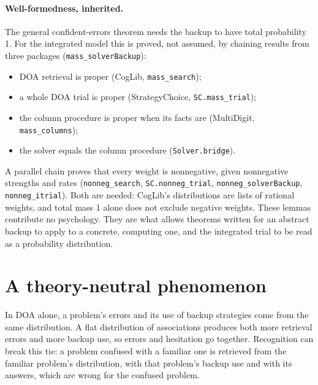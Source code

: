 \documentclass[11pt]{article}
\newcommand{\lean}[1]{\texttt{#1}}
\begin{document}
\paragraph{Well-formedness, inherited.} The general confident-errors theorem needs the backup to have total probability 1. For the integrated model this is proved, not assumed, by chaining results from three packages (\lean{mass\_solverBackup}):
\begin{itemize}
  \item DOA retrieval is proper (CogLib, \lean{mass\_search});
  \item a whole DOA trial is proper (StrategyChoice, \lean{SC.mass\_trial});
  \item the column procedure is proper when its facts are (MultiDigit, \lean{mass\_columns});
  \item the solver equals the column procedure (\lean{Solver.bridge}).
\end{itemize}
A parallel chain proves that every weight is nonnegative, given nonnegative strengths and rates (\lean{nonneg\_search}, \lean{SC.nonneg\_trial}, \lean{nonneg\_solverBackup}, \lean{nonneg\_itrial}). Both are needed: CogLib's distributions are lists of rational weights, and total mass 1 alone does not exclude negative weights. These lemmas contribute no psychology. They are what allows theorems written for an abstract backup to apply to a concrete, computing one, and the integrated trial to be read as a probability distribution.

\section{A theory-neutral phenomenon}
\label{sec:phen}

In DOA alone, a problem's errors and its use of backup strategies come from the same distribution. A flat distribution of associations produces both more retrieval errors and more backup use, so errors and hesitation go together. Recognition can break this tie: a problem confused with a familiar one is retrieved from the familiar problem's distribution, with that problem's backup use and with its answers, which are wrong for the confused problem.
\end{document}
